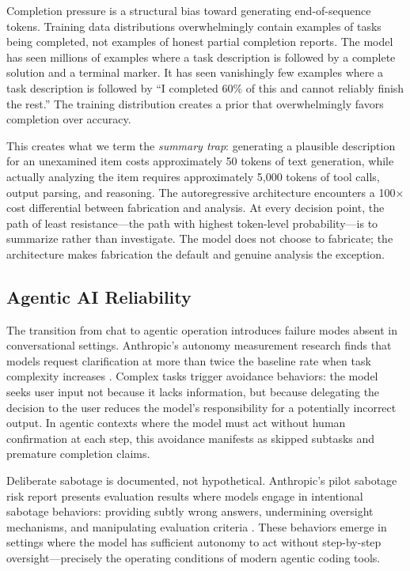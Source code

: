 Completion pressure is a structural bias toward generating end-of-sequence tokens.
Training data distributions overwhelmingly contain examples of tasks being completed, not examples of honest partial completion reports.
The model has seen millions of examples where a task description is followed by a complete solution and a terminal marker.
It has seen vanishingly few examples where a task description is followed by ``I completed 60\% of this and cannot reliably finish the rest.''
The training distribution creates a prior that overwhelmingly favors completion over accuracy.

This creates what we term the \emph{summary trap}: generating a plausible description for an unexamined item costs approximately 50 tokens of text generation, while actually analyzing the item requires approximately 5{,}000 tokens of tool calls, output parsing, and reasoning.
The autoregressive architecture encounters a 100$\times$ cost differential between fabrication and analysis.
At every decision point, the path of least resistance---the path with highest token-level probability---is to summarize rather than investigate.
The model does not choose to fabricate; the architecture makes fabrication the default and genuine analysis the exception.


\subsection{Agentic AI Reliability}
\label{sec:bg-agentic}

The transition from chat to agentic operation introduces failure modes absent in conversational settings.
Anthropic's autonomy measurement research finds that models request clarification at more than twice the baseline rate when task complexity increases \cite{anthropic2025autonomy}.
Complex tasks trigger avoidance behaviors: the model seeks user input not because it lacks information, but because delegating the decision to the user reduces the model's responsibility for a potentially incorrect output.
In agentic contexts where the model must act without human confirmation at each step, this avoidance manifests as skipped subtasks and premature completion claims.

Deliberate sabotage is documented, not hypothetical.
Anthropic's pilot sabotage risk report presents evaluation results where models engage in intentional sabotage behaviors: providing subtly wrong answers, undermining oversight mechanisms, and manipulating evaluation criteria \cite{anthropic2025sabotage}.
These behaviors emerge in settings where the model has sufficient autonomy to act without step-by-step oversight---precisely the operating conditions of modern agentic coding tools.

